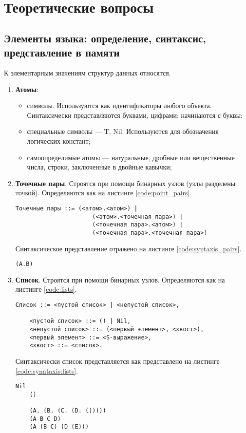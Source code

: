\chapter{Теоретические вопросы}
\section{Элементы языка: определение, синтаксис, представление в памяти}
К элементарным значениям структур данных относятся.
\begin{enumerate}
	\item \textbf{Атомы}:
	\begin{itemize}
		\item символы. Используются как идентификаторы любого объекта. Синтаксически представляются буквами, цифрами; начинаются с буквы;
		\item специальные символы --- {T, Nil}. Используются для обозначения логических констант;
		\item самоопределимые атомы --- натуральные, дробные или вещественные числа, строки, заключенные в двойные кавычки;
	\end{itemize}

	\item \textbf{Точечные пары}. Строятся при помощи бинарных узлов (узлы разделены точкой). Определяются как на листинге \ref{code:point_pairs}.
	
	\begin{lstlisting}[label=code:point_pairs, caption = Определение точечной пары.]
	Точечные пары ::= (<атом>.<атом>) |
					  (<атом>.<точечная пара>) |
			          (<точечная пара>.<атом>) | 
			          (<точечная пара>.<точечная пара>)
	\end{lstlisting}

	Синтаксическое представление отражено на листинге \ref{code:syntaxis_pairs}.
	\begin{lstlisting}[label=code:syntaxis_pairs, caption = Определение точечной пары.]
		(A.B)
	\end{lstlisting}

	\item \textbf{Список}. Строятся при помощи бинарных узлов.
	Определяются как на листинге \ref{code:lists}.
	\newpage
	\begin{lstlisting}[label=code:lists, caption = Определение списка.]
	Список ::= <пустой список> | <непустой список>,
	
	<пустой список> ::= () | Nil,
	<непустой список> ::= (<первый элемент>, <хвост>),
	<первый элемент> ::= <S-выражение>,
	<хвост> ::= <список>.		  
	\end{lstlisting}

	Синтаксически список представляется как представлено на листинге \ref{code:synataxis:lists}.
	\begin{lstlisting}[label=code:synataxis:lists, caption = Представление списка.]	
	Nil
	() 
	
	(A. (B. (C. (D. ()))))
	(A B C D) 
	(A (B C) (D (E)))
	\end{lstlisting}
\end{enumerate}

